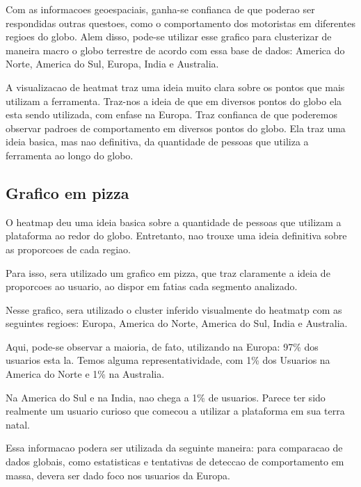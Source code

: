 \documentclass[10pt, conference]{IEEEtran}
\begin{document}
Com as informacoes geoespaciais, ganha-se confianca de que poderao ser respondidas outras questoes,
como o comportamento dos motoristas em diferentes regioes do globo. Alem disso, pode-se utilizar
esse grafico para clusterizar de maneira macro o globo terrestre de acordo com essa base de 
dados: America do Norte, America do Sul, Europa, India e Australia.

A visualizacao de heatmat traz uma ideia muito clara sobre os pontos que mais utilizam a 
ferramenta. Traz-nos a ideia de que em diversos pontos do globo ela esta sendo utilizada, com
enfase na Europa. Traz confianca de que poderemos observar padroes de comportamento em diversos
pontos do globo. Ela traz uma ideia basica, mas nao definitiva, da quantidade de pessoas
que utiliza a ferramenta ao longo do globo.




\subsection{Grafico em pizza}

O heatmap deu uma ideia basica sobre a quantidade de pessoas que utilizam a plataforma ao redor
do globo. Entretanto, nao trouxe uma ideia definitiva sobre as proporcoes de cada regiao.

Para isso, sera utilizado um grafico em pizza, que traz claramente a ideia de proporcoes ao
usuario, ao dispor em fatias cada segmento analizado.

Nesse grafico, sera utilizado o cluster inferido visualmente do heatmatp com as seguintes
regioes: Europa, America do Norte, America do Sul, India e Australia.

Aqui, pode-se observar a maioria, de fato, utilizando na Europa: 97\% dos usuarios
esta la. Temos alguma representatividade, com 1\% dos Usuarios na America do Norte e 1\% 
na Australia.

Na America do Sul e na India, nao chega a 1\% de usuarios. Parece ter sido realmente um usuario
curioso que comecou a utilizar a plataforma em sua terra natal.

Essa informacao podera ser utilizada da seguinte maneira: para comparacao de
dados globais, como estatisticas e tentativas de deteccao de comportamento em massa, devera
ser dado foco nos usuarios da Europa.
\end{document}
